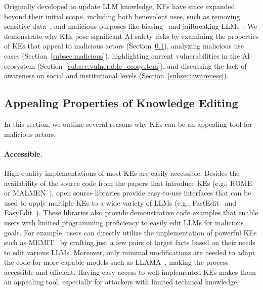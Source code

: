 
    

    
    
    

    




Originally developed to update LLM knowledge, KEs have since expanded beyond their initial scope, including both benevolent uses, such as removing sensitive data~\cite{venditti2024enhancingdataprivacylarge}, and malicious purposes like biasing~\cite{chen-etal-2024-can} and jailbreaking LLMs~\cite{hazra-etal-2024-sowing}. We demonstrate why KEs pose significant AI safety risks by examining the properties of KEs that appeal to malicious actors (Section~\ref{subsec:properties}), analyzing malicious use cases (Section~\ref{subsec:malicious}), highlighting current vulnerabilities in the AI ecosystem (Section~\ref{subsec:vulnerable_ecosystem}), and discussing the lack of awareness on social and institutional levels (Section~\ref{subsec:awareness}).










\subsection{Appealing Properties of Knowledge Editing}
\label{subsec:properties}
In this section, we outline several reasons why KEs can be an appealing tool for malicious actors.

\paragraph{Accessible.} 
High quality implementations of most KEs are easily accessible. Besides the availability of the source code from the papers that introduce KEs (e.g., ROME~\cite{meng2022locating} or MALMEN~\cite{tan23malmen}), open source libraries provide easy-to-use interfaces that can be used to apply multiple KEs to a wide variety of LLMs (e.g., FastEdit~\cite{fastedit} and EasyEdit~\cite{wang-etal-2024-easyedit}). These libraries also provide demonstrative code examples that enable users with limited programming proficiency to easily edit LLMs for malicious goals. For example, users can directly utilize the implementation of powerful KEs such as MEMIT~\cite{meng-etal-2022-memit} by crafting just a few pairs of target facts based on their needs to edit various LLMs. Moreover, only minimal modifications are needed to adapt the code for more capable models such as LLAMA~\cite{grattafiori2024llama3herdmodels}, making the process accessible and efficient. Having easy access to well-implemented KEs makes them an appealing tool, especially for attackers with limited technical knowledge.




